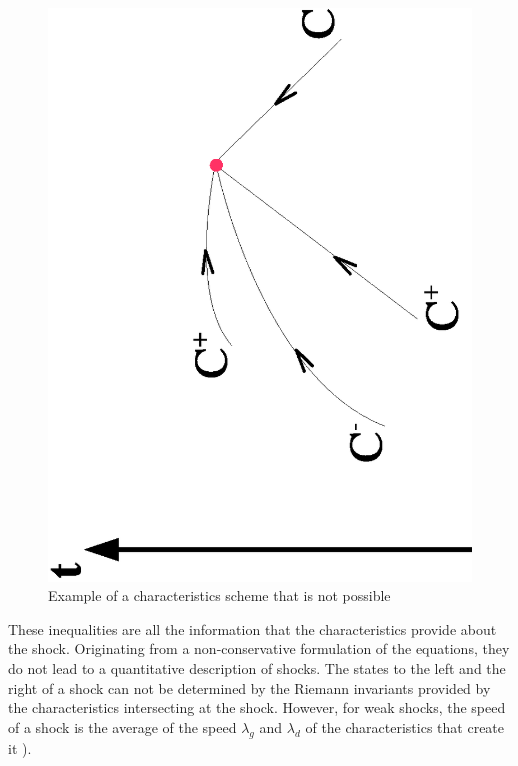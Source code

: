 \begin{figure}
 \begin{center}
  \includegraphics[scale=0.5,angle=270]{Figures/Trajec_imposs.eps} \hspace{2cm}
  \vspace{1.cm}
  \caption{Example of a characteristics scheme that is not possible}
  \label{Timp}
 \end{center}
\end{figure}

\vspace{0.5cm}

These inequalities are all the information that the characteristics provide about the shock. Originating from a non-conservative formulation of the equations, they do not lead to a quantitative description of shocks. The states to the left and the right of a shock can not be determined by the Riemann invariants provided by the characteristics intersecting at the shock. However, for weak shocks, the speed of a shock is the average of the speed $\lambda_g$ and $\lambda_d$ of the characteristics that create it \cite{SMOLLER83}\cite{LAX72}).

